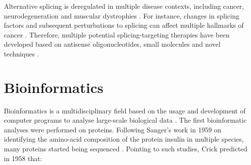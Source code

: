 Alternative splicing is deregulated in multiple disease contexts, including cancer, neurodegeneration and muscular dystrophies \cite{gallego-paez:2017wc,montes:2019ww}. For instance, changes in splicing factors and subsequent  perturbations to splicing can affect multiple hallmarks of cancer \cite{zhang:2021wn}. Therefore, multiple potential splicing-targeting therapies have been developed based on antisense oligonucleotides, small molecules and novel techniques \cite{montes:2019ww}.



\section{Bioinformatics}



Bioinformatics is a multidisciplinary field based on the usage and development of computer programs to analyse large-scale biological data \cite{gauthier:2018ws}. The first bioinformatic analyses were performed on proteins. Following Sanger's work in 1959 on identifying the amino-acid composition of the protein insulin in multiple species, many proteins started being sequenced \cite{sanger:1955uw,ryle:1955wf,harris:1956ut,gauthier:2018ws}.
Pointing to such studies, Crick predicted in 1958 that:

